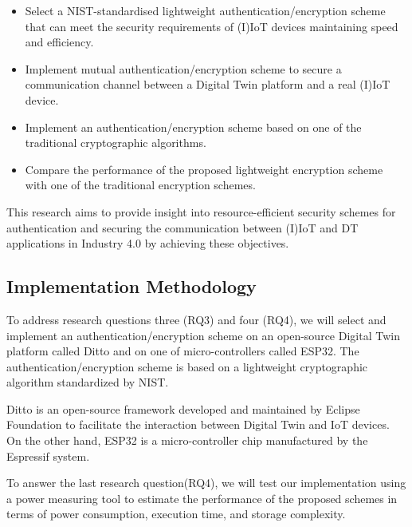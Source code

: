 \begin{itemize}

    \item Select a NIST-standardised lightweight authentication/encryption scheme that can meet the security requirements of (I)IoT devices maintaining speed and efficiency.

    \item Implement mutual authentication/encryption scheme to secure a communication channel between a Digital Twin platform and a real (I)IoT device. 
    
    \item Implement an authentication/encryption scheme based on one of the traditional cryptographic algorithms. 

    \item Compare the performance of the proposed lightweight encryption scheme with one of the traditional encryption schemes.

\end{itemize}
This research aims to provide insight into resource-efficient security schemes for authentication and securing the communication between  (I)IoT  and DT applications in Industry 4.0 by achieving these objectives.




\subsection{Implementation Methodology}
To address research questions three (RQ3) and four (RQ4), we will select and implement an authentication/encryption scheme on
an open-source Digital Twin platform called Ditto and on one of micro-controllers called ESP32. The authentication/encryption scheme is based on a lightweight cryptographic algorithm standardized by NIST. 

Ditto is an open-source framework developed and maintained by Eclipse Foundation to facilitate the interaction between Digital Twin and IoT devices\cite{noauthor_eclipse_nodate}. On the other hand, ESP32 is a micro-controller chip manufactured by the Espressif system. 

To answer the last research question(RQ4), we will test our implementation
using a power measuring tool to estimate the performance of the proposed schemes in terms of power
consumption, execution time, and storage complexity. 

